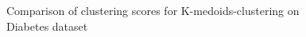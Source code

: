 \begin{figure}[H]
	\centering
	
	\caption{Comparison of clustering scores for K-medoids-clustering on Diabetes dataset}%
	\label{fig:kmedoids_diabetes}
\end{figure}

